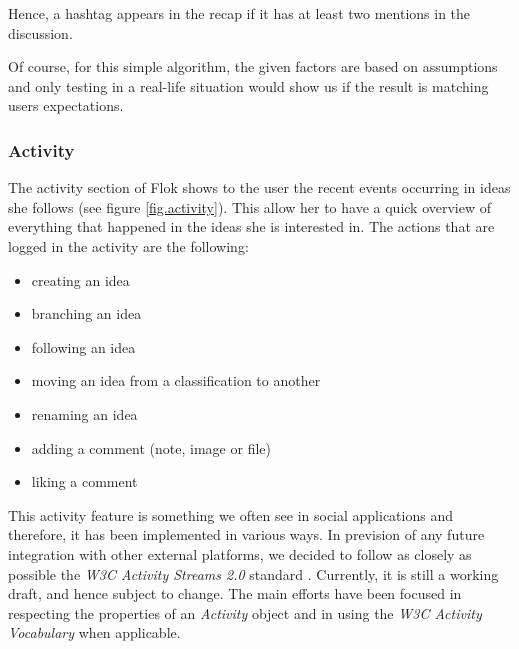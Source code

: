 \documentclass[a4paper,12pt,twoside]{article}
\begin{document}
Hence, a hashtag appears in the recap if it has at least two mentions in the discussion.

Of course, for this simple algorithm, the given factors are based on assumptions and only testing in a real-life situation would show us if the result is matching users expectations.

\subsubsection{Activity}
The activity section of Flok shows to the user the recent events occurring in ideas she follows (see figure \ref{fig.activity}).
This allow her to have a quick overview of everything that happened in the ideas she is interested in.
The actions that are logged in the activity are the following:
\begin{multicols}{2}
    \begin{itemize}
        \item creating an idea
        \item branching an idea
        \item following an idea
        \item moving an idea from a classification to another
        \item renaming an idea
        \item adding a comment (note, image or file)
        \item liking a comment
    \end{itemize}
\end{multicols}

This activity feature is something we often see in social applications and therefore, it has been implemented in various ways.
In prevision of any future integration with other external platforms, we decided to follow as closely as possible the \emph{W3C Activity Streams 2.0} standard \cite{snell2015AS2}.
Currently, it is still a working draft, and hence subject to change.
The main efforts have been focused in respecting the properties of an \emph{Activity} object and in using the \emph{W3C Activity Vocabulary} \cite{snell2015AV} when applicable.

\end{document}
